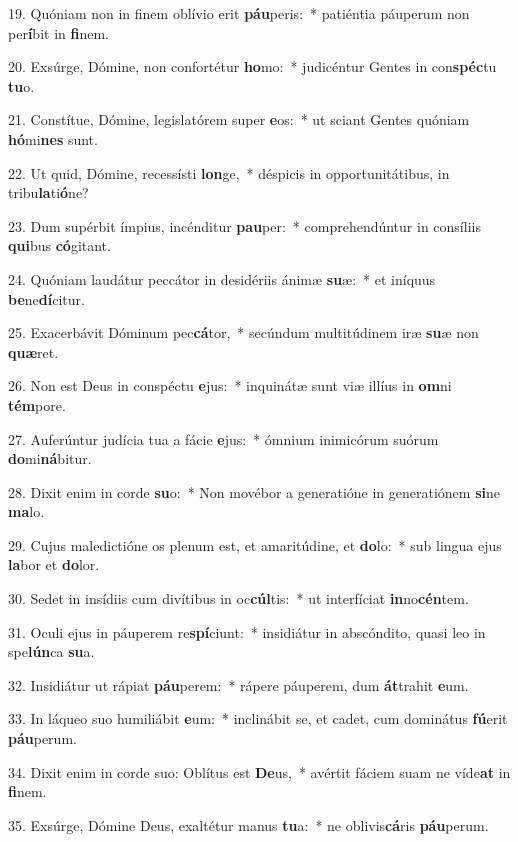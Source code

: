 19. Quóniam non in finem oblívio erit \textbf{páu}peris:~*  patiéntia páuperum non per\textbf{í}bit in \textbf{fi}nem.\

20. Exsúrge, Dómine, non confortétur \textbf{ho}mo:~*  judicéntur Gentes in con\textbf{spéc}tu \textbf{tu}o.\

21. Constítue, Dómine, legislatórem super \textbf{e}os:~*  ut sciant Gentes quóniam \textbf{hó}mi\textbf{nes} sunt.\

22. Ut quid, Dómine, recessísti \textbf{lon}ge,~*  déspicis in opportunitátibus, in tribu\textbf{la}ti\textbf{ó}ne?\

23. Dum supérbit ímpius, incénditur \textbf{pau}per:~*  comprehendúntur in consíliis \textbf{qui}bus \textbf{có}gitant.\

24. Quóniam laudátur peccátor in desidériis ánimæ \textbf{su}æ:~*  et iníquus \textbf{be}ne\textbf{dí}citur.\

25. Exacerbávit Dóminum pec\textbf{cá}tor,~*  secúndum multitúdinem iræ \textbf{su}æ non \textbf{quæ}ret.\

26. Non est Deus in conspéctu \textbf{e}jus:~*  inquinátæ sunt viæ illíus in \textbf{om}ni \textbf{tém}pore.\

27. Auferúntur judícia tua a fácie \textbf{e}jus:~*  ómnium inimicórum suórum \textbf{do}mi\textbf{ná}bitur.\

28. Dixit enim in corde \textbf{su}o:~*  Non movébor a generatióne in generatiónem \textbf{si}ne \textbf{ma}lo.\

29. Cujus maledictióne os plenum est, et amaritúdine, et \textbf{do}lo:~*  sub lingua ejus \textbf{la}bor et \textbf{do}lor.\

30. Sedet in insídiis cum divítibus in oc\textbf{cúl}tis:~*  ut interfíciat \textbf{in}no\textbf{cén}tem.\

31. Oculi ejus in páuperem re\textbf{spí}ciunt:~*  insidiátur in abscóndito, quasi leo in spe\textbf{lún}ca \textbf{su}a.\

32. Insidiátur ut rápiat \textbf{páu}perem:~*  rápere páuperem, dum \textbf{át}trahit \textbf{e}um.\

33. In láqueo suo humiliábit \textbf{e}um:~*  inclinábit se, et cadet, cum dominátus \textbf{fú}erit \textbf{páu}perum.\

34. Dixit enim in corde suo: Oblítus est \textbf{De}us,~*  avértit fáciem suam ne víde\textbf{at} in \textbf{fi}nem.\

35. Exsúrge, Dómine Deus, exaltétur manus \textbf{tu}a:~*  ne oblivis\textbf{cá}ris \textbf{páu}perum.\

